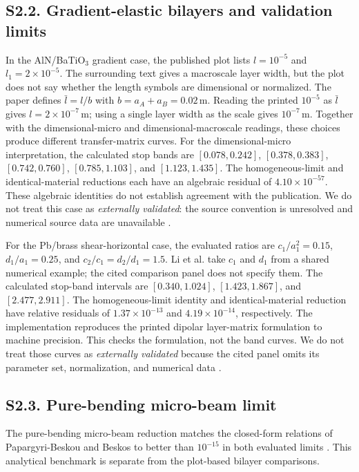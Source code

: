 \documentclass[preprint,12pt]{elsarticle}
\begin{document}
\subsection*{S2.2. Gradient-elastic bilayers and validation limits}
In the AlN/BaTiO$_3$ gradient case, the published plot lists $l=10^{-5}$ and $l_1=2\times10^{-5}$. The surrounding text gives a macroscale layer width, but the plot does not say whether the length symbols are dimensional or normalized. The paper defines $\bar l=l/b$ with $b=a_A+a_B=0.02\,\mathrm{m}$. Reading the printed $10^{-5}$ as $\bar l$ gives $l=2\times10^{-7}\,\mathrm{m}$; using a single layer width as the scale gives $10^{-7}\,\mathrm{m}$. Together with the dimensional-micro and dimensional-macroscale readings, these choices produce different transfer-matrix curves. For the dimensional-micro interpretation, the calculated stop bands are $[0.078,0.242]$, $[0.378,0.383]$, $[0.742,0.760]$, $[0.785,1.103]$, and $[1.123,1.435]$. The homogeneous-limit and identical-material reductions each have an algebraic residual of $4.10\times10^{-57}$. These algebraic identities do not establish agreement with the publication. We do not treat this case as \emph{externally validated}: the source convention is unresolved and numerical source data are unavailable \cite{li2024anchorB}.

For the Pb/brass shear-horizontal case, the evaluated ratios are $c_1/a_1^2=0.15$, $d_1/a_1=0.25$, and $c_2/c_1=d_2/d_1=1.5$. Li et al. take $c_1$ and $d_1$ from a shared numerical example; the cited comparison panel does not specify them. The calculated stop-band intervals are $[0.340,1.024]$, $[1.423,1.867]$, and $[2.477,2.911]$. The homogeneous-limit identity and identical-material reduction have relative residuals of $1.37\times10^{-13}$ and $4.19\times10^{-14}$, respectively. The implementation reproduces the printed dipolar layer-matrix formulation to machine precision. This checks the formulation, not the band curves. We do not treat those curves as \emph{externally validated} because the cited panel omits its parameter set, normalization, and numerical data \cite{li2023anchorA,liweizhou2016}.

\subsection*{S2.3. Pure-bending micro-beam limit}
The pure-bending micro-beam reduction matches the closed-form relations of Papargyri-Beskou and Beskos to better than $10^{-15}$ in both evaluated limits \cite{papargyribeskou2009}. This analytical benchmark is separate from the plot-based bilayer comparisons.
\end{document}
